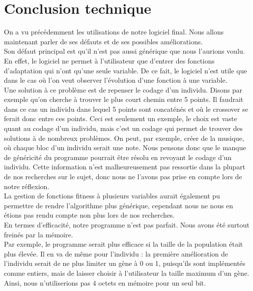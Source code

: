 \documentclass[a4paper,11pt]{article}
\title{\vspace{13em}{\huge Rapport Final}}
\author{Edouard Fouassier - Maxime Gonthier - Benjamin Guillot\\
		Laureline Martin - Rémi Navarro - Lydia Rodrigez de la Nava
		\vspace{2em}\\
		Algorithme Génétique
		\vspace{2em}}
\begin{document}
	
	\clearpage
	\maketitle\vspace{13em}
\newpage
\tableofcontents
\newpage\clearpage{}
	\section{Conclusion technique}
		On a vu précédemment les utilisations de notre logiciel final. Nous allons maintenant parler de ses défauts et de ses possibles améliorations.\\
		Son défaut principal est qu’il n’est pas aussi générique que nous l’aurions voulu. En effet, le logiciel ne permet à l’utilisateur que d’entrer des fonctions d’adaptation qui n’ont qu’une seule variable. De ce fait, le logiciel n’est utile que dans le cas où l’on veut observer l’évolution d’une fonction à une variable.\\
		Une solution à ce problème est de repenser le codage d’un individu. Disons par exemple qu’on cherche à trouver le plus court chemin entre 5 points. Il faudrait dans ce cas un individu dans lequel 5 points sont concaténés et où le crossover se ferait donc entre ces points. Ceci est seulement un exemple, le choix est vaste quant au codage d’un individu, mais c’est un codage qui permet de trouver des solutions à de nombreux problèmes. On peut, par exemple, créer de la musique, où chaque bloc d’un individu serait une note.  Nous pensons donc que le manque de généricité du programme pourrait être résolu en revoyant le codage d’un individu. Cette information n’est malheureusement pas ressortie dans la plupart de nos recherches sur le sujet, donc nous ne l’avons pas prise en compte lors de notre réflexion.\\
		La gestion de fonctions fitness à plusieurs variables aurait également pu permettre de rendre l'algorithme plus générique, cependant nous ne nous en étions pas rendu compte non plus lors de nos recherches.\\
		En termes d’efficacité, notre programme n’est pas parfait. Nous avons été surtout freinés par la mémoire.\\
		Par exemple, le programme serait plus efficace si la taille de la population était plus élevée. Il en va de même pour l’individu : la première amélioration de l’individu serait de ne plus limiter un gène à 0 ou 1, puisqu’ils sont implémentés comme entiers, mais de laisser choisir à l’utilisateur la taille maximum d’un gène. Ainsi, nous n’utiliserions pas 4 octets en mémoire pour un seul bit.
\end{document}
